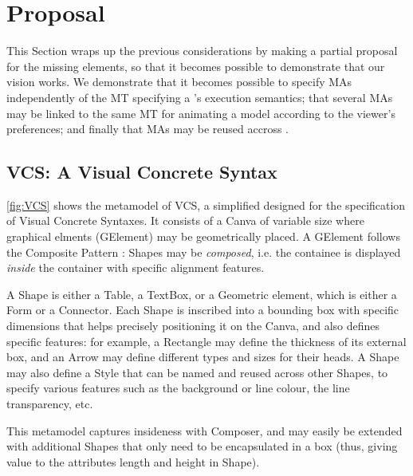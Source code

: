 \section{Proposal}
\label{sec:Proposal}

This Section wraps up the previous considerations by making a partial proposal
for the missing elements, so that it becomes possible to demonstrate that our vision
works. We demonstrate that it becomes possible to specify MAs independently of the
MT specifying a \DSL's execution semantics; that several MAs may be linked to
the same MT for animating a model according to the viewer's preferences; and finally
that MAs may be reused accross \DSLs.


\subsection{\textsf{VCS}: A Visual Concrete Syntax \DSL}
\label{sec:Proposal-VCS}

\autoref{fig:VCS} shows the metamodel of \textsf{VCS}, a simplified \DSL designed
for the specification of Visual Concrete Syntaxes. It consists of a \textsf{Canva}
of variable size where graphical elments (\textsf{GElement}) may be geometrically
placed. A \textsf{GElement} follows the Composite Pattern \citep{B:Gamma-etAl:1995}:
\textsf{Shape}s may be \emph{composed}, i.e. the \textsf{containee} is displayed
\emph{inside} the \textsf{container} with specific alignment features. 

A \textsf{Shape} is either a \textsf{Table}, a \textsf{TextBox}, or a 
\textsf{Geometric} element, which is either a \textsf{Form} or a 
\textsf{Connector}. Each \textsf{Shape} is inscribed into a bounding box with specific 
dimensions that helps precisely positioning it on the \textsf{Canva}, and also
defines specific features: for example, a Rectangle may define the thickness of its
external box, and an Arrow may define different types and sizes for their heads.
A \textsf{Shape} may also define a \textsf{Style} that can be \textsf{name}d and
reused across other \textsf{Shape}s, to specify various features such as the background
or line colour, the line transparency, etc.

This metamodel captures insideness with \textsf{Composer}, and may easily be extended
with additional \textsf{Shape}s that only need to be encapsulated in a box (thus,
giving value to the attributes \textsf{length} and \textsf{height} in \textsf{Shape}).


